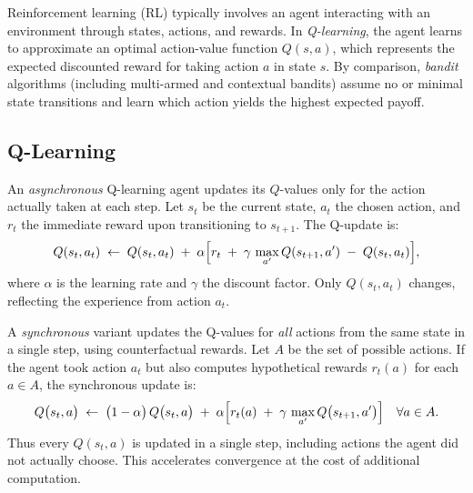 
\label{sec:algorithms}

Reinforcement learning (RL) typically involves an agent interacting with an environment through states, actions, and rewards. In \emph{Q-learning}, the agent learns to approximate an optimal action-value function $Q(s,a)$, which represents the expected discounted reward for taking action $a$ in state $s$. By comparison, \emph{bandit} algorithms (including multi-armed and contextual bandits) assume no or minimal state transitions and learn which action yields the highest expected payoff.

\subsection{Q-Learning}
\label{sec:qlearning}

An \emph{asynchronous} Q-learning agent updates its $Q$-values only for the action actually taken at each step. Let $s_t$ be the current state, $a_t$ the chosen action, and $r_t$ the immediate reward upon transitioning to $s_{t+1}$. The Q-update is:
\begin{equation}
Q(s_t,a_t)
\;\leftarrow\;
Q(s_t,a_t)
\;+\;
\alpha \Bigl[
  r_t
  \;+\;
  \gamma \,\max_{a'} Q(s_{t+1},a')
  \;-\;
  Q(s_t,a_t)
\Bigr],
\label{eq:qlearning_async}
\end{equation}
where $\alpha$ is the learning rate and $\gamma$ the discount factor. Only $Q(s_t,a_t)$ changes, reflecting the experience from action $a_t$.

A \emph{synchronous} variant updates the Q-values for \emph{all} actions from the same state in a single step, using counterfactual rewards. Let $A$ be the set of possible actions. If the agent took action $a_t$ but also computes hypothetical rewards $r_t(a)$ for each $a \in A$, the synchronous update is:
\begin{equation}
Q\bigl(s_t,a\bigr)
\;\leftarrow\;
\bigl(1-\alpha\bigr)\,Q\bigl(s_t,a\bigr)
\;+\;
\alpha \Bigl[
  r_t(a)
  \;+\;
  \gamma \,\max_{a'} Q\bigl(s_{t+1},a'\bigr)
\Bigr]
\quad
\forall a \in A.
\label{eq:qlearning_sync}
\end{equation}
Thus every $Q(s_t,a)$ is updated in a single step, including actions the agent did not actually choose. This accelerates convergence at the cost of additional computation.

